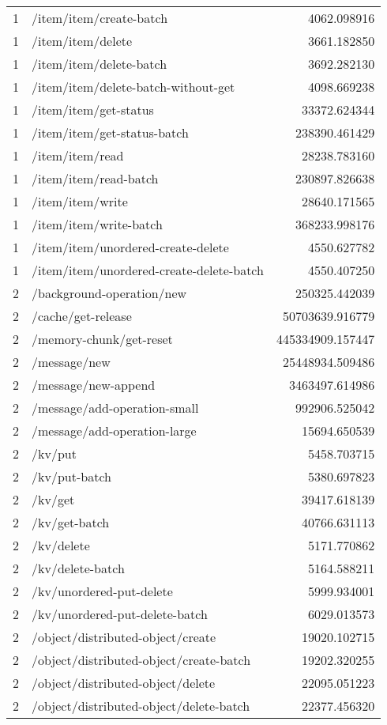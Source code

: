 \begin{longtable}{rlr}
1 & /item/item/create-batch & 4062.098916 \\
1 & /item/item/delete & 3661.182850 \\
1 & /item/item/delete-batch & 3692.282130 \\
1 & /item/item/delete-batch-without-get & 4098.669238 \\
1 & /item/item/get-status & 33372.624344 \\
1 & /item/item/get-status-batch & 238390.461429 \\
1 & /item/item/read & 28238.783160 \\
1 & /item/item/read-batch & 230897.826638 \\
1 & /item/item/write & 28640.171565 \\
1 & /item/item/write-batch & 368233.998176 \\
1 & /item/item/unordered-create-delete & 4550.627782 \\
1 & /item/item/unordered-create-delete-batch & 4550.407250 \\
2 & /background-operation/new & 250325.442039 \\
2 & /cache/get-release & 50703639.916779 \\
2 & /memory-chunk/get-reset & 445334909.157447 \\
2 & /message/new & 25448934.509486 \\
2 & /message/new-append & 3463497.614986 \\
2 & /message/add-operation-small & 992906.525042 \\
2 & /message/add-operation-large & 15694.650539 \\
2 & /kv/put & 5458.703715 \\
2 & /kv/put-batch & 5380.697823 \\
2 & /kv/get & 39417.618139 \\
2 & /kv/get-batch & 40766.631113 \\
2 & /kv/delete & 5171.770862 \\
2 & /kv/delete-batch & 5164.588211 \\
2 & /kv/unordered-put-delete & 5999.934001 \\
2 & /kv/unordered-put-delete-batch & 6029.013573 \\
2 & /object/distributed-object/create & 19020.102715 \\
2 & /object/distributed-object/create-batch & 19202.320255 \\
2 & /object/distributed-object/delete & 22095.051223 \\
2 & /object/distributed-object/delete-batch & 22377.456320 \\

\end{longtable}
